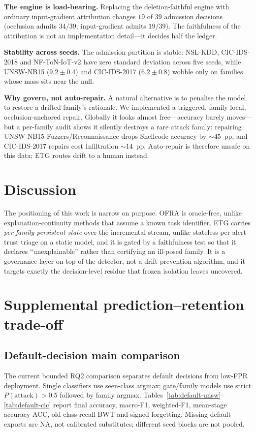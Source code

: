 \documentclass[conference]{IEEEtran}
\begin{document}
\textbf{The engine is load-bearing.} Replacing the deletion-faithful engine with
ordinary input-gradient attribution changes $19$ of $39$ admission decisions
(occlusion admits $34/39$; input-gradient admits $19/39$). The faithfulness of
the attribution is not an implementation detail---it decides half the ledger.

\textbf{Stability across seeds.} The admission partition is stable: NSL-KDD,
CIC-IDS-2018 and NF-ToN-IoT-v2 have zero standard deviation across five seeds,
while UNSW-NB15 ($9.2\pm0.4$) and CIC-IDS-2017 ($6.2\pm0.8$) wobble only on
families whose mass sits near the null.

\textbf{Why govern, not auto-repair.} A natural alternative is to penalise the
model to restore a drifted family's rationale. We implemented a triggered,
family-local, occlusion-anchored repair. Globally it looks almost free---accuracy
barely moves---but a per-family audit shows it silently destroys a rare attack
family: repairing UNSW-NB15 Fuzzers/Reconnaissance drops Shellcode accuracy by
$\sim\!45$~pp, and CIC-IDS-2017 repairs cost Infiltration $\sim\!14$~pp.
Auto-repair is therefore unsafe on this data; ETG routes drift to a human
instead.

\section{Discussion}
\label{sec:discussion}

The positioning of this work is narrow on purpose. OFRA is oracle-free, unlike
explanation-continuity methods that assume a known task identifier. ETG carries
\emph{per-family persistent state} over the incremental stream, unlike stateless
per-alert trust triage on a static model, and it is gated by a faithfulness test
so that it declares ``unexplainable'' rather than certifying an ill-posed family.
It is a governance layer on top of the detector, not a drift-prevention
algorithm, and it targets exactly the decision-level residue that frozen
isolation leaves uncovered.

\section{Supplemental prediction--retention trade-off}
\subsection{Default-decision main comparison}
The current bounded RQ2 comparison separates default decisions from low-FPR deployment. Single classifiers use seen-class argmax; gate/family models use strict $P(\mathrm{attack})>0.5$ followed by family argmax. Tables~\ref{tab:default-unsw}--\ref{tab:default-cic} report final accuracy, macro-F1, weighted-F1, mean-stage accuracy ACC, old-class recall BWT and signed forgetting. Missing default exports are NA, not calibrated substitutes; different seed blocks are not pooled.

\end{document}
